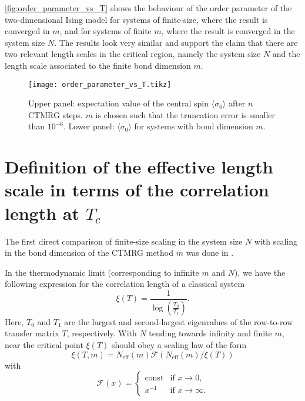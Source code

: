 \autoref{fig:order_parameter_vs_T} shows the behaviour of the order parameter of the
two-dimensional Ising model for systems of finite-size,
where the result is converged in $m$, and for systems of finite $m$, where
the result is converged in the system size $N$. The results look very similar and support
the claim that there are two relevant length scales in the critical region, namely the system size $N$ and
the length scale associated to the finite bond dimension $m$.

\begin{figure}
\texttt{[image: order\_parameter\_vs\_T.tikz]}
\caption{Upper panel: expectation value of the central spin $\langle \sigma_0 \rangle$
  after $n$ CTMRG steps. $m$ is chosen such that the truncation error is smaller than
  $10^{-6}$. Lower panel: $\langle \sigma_0 \rangle$ for systems with bond dimension $m$.}\label{fig:order_parameter_vs_T}
\end{figure}

\section{Definition of the effective length scale in terms of the correlation length at $T_c$}\label{sec:definition_effective_length_scale_in_terms_of_xi}

The first direct comparison of finite-size scaling in the system size $N$ with scaling in
the bond dimension of the CTMRG method $m$ was done
in \cite{nishino1996numerical}.

In the thermodynamic limit (corresponding to infinite $m$ and $N$), we have the following
expression for the correlation length of a classical system
\cite{baxter1982exactly_correlation_length}
\begin{equation}\label{eq:correlation_length_row_to_row_transfer_matrix}
  \xi(T) = \frac{1}{\log\left(\frac{T_0}{T_1}\right)}.
\end{equation}
Here, $T_0$ and $T_1$ are the largest and second-largest eigenvalues of the row-to-row
transfer matrix $T$, respectively. With $N$ tending towards infinity and finite $m$, near
the critical point $\xi(T)$ should obey a scaling law of the form
\begin{equation}
  \xi(T, m) = N_{\text{eff}}(m) \mathcal{F}(N_{\text{eff}}(m) / \xi(T))
\end{equation}
with
\begin{equation}
  \mathcal{F}(x) = \begin{cases}
      \text{const} & \text{if } x \to 0, \\
      x^{-1} & \text{if } x \to \infty.
    \end{cases}
\end{equation}

